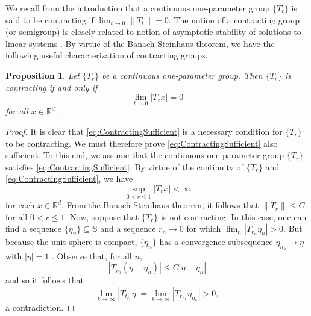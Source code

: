 \documentclass[11pt]{article}
\newtheorem{proposition}[theorem]{Proposition}
\theoremstyle{remark}
\begin{document}
\noindent We recall from the introduction that a continuous one-parameter group $\{T_t\}$ is said to be contracting if $\lim_{t\to 0}\|T_t\|=0$. The notion of a contracting group (or semigroup) is closely related to notion of asymptotic stability of solutions to linear systems \cite{braun_differential_1993}. By virtue of the Banach-Steinhaus theorem, we have the following useful characterization of contracting groups.
\begin{proposition}\label{prop:ContractingCharacterization}
Let $\{T_r\}$ be a continuous one-parameter group. Then $\{T_r\}$ is contracting if and only if
\begin{equation}\label{eq:ContractingSufficient}
\lim_{t\to 0}|T_rx|=0
\end{equation}
for all $x\in\mathbb{R}^d$.
\end{proposition}

\begin{proof}It is clear that \eqref{eq:ContractingSufficient} is a necessary condition for $\{T_r\}$ to be contracting. We must therefore prove \eqref{eq:ContractingSufficient} also sufficient. To this end, we assume that the continuous one-parameter group $\{T_r\}$ satisfies \eqref{eq:ContractingSufficient}. By virtue of the continuity of $\{T_r\}$ and \eqref{eq:ContractingSufficient}, we have
\begin{equation*}
\sup_{0<r\leq 1}|T_r x|<\infty
 \end{equation*}
for each $x\in\mathbb{R}^d$. From the Banach-Steinhaus theorem, it follows that $\|T_r\|\leq C$ for all $0<r\leq 1$. Now, suppose that $\{T_r\}$ is not contracting. In this case, one can find a sequence $\{\eta_n\}\subseteq\mathbb{S}$ and a sequence $r_n\rightarrow 0$ for which $\lim_n|T_{r_n}\eta_n|>0$. But because the unit sphere is compact, $\{\eta_n\}$ has a convergence subsequence $\eta_{n_k}\rightarrow \eta$ with $|\eta|=1$ . Observe that, for all $n$,
 \begin{equation*}
 |T_{r_n}(\eta-\eta_n)|\leq C|\eta-\eta_n|
 \end{equation*}
 and so it follows that
 \begin{equation*}
 \lim_{k\rightarrow\infty}|T_{t_{r_k}}\eta|=\lim_{k\rightarrow\infty}|T_{r_{n_k}}\eta_{n_k}|>0,
 \end{equation*}
 a contradiction.
 \end{proof}
\end{document}
